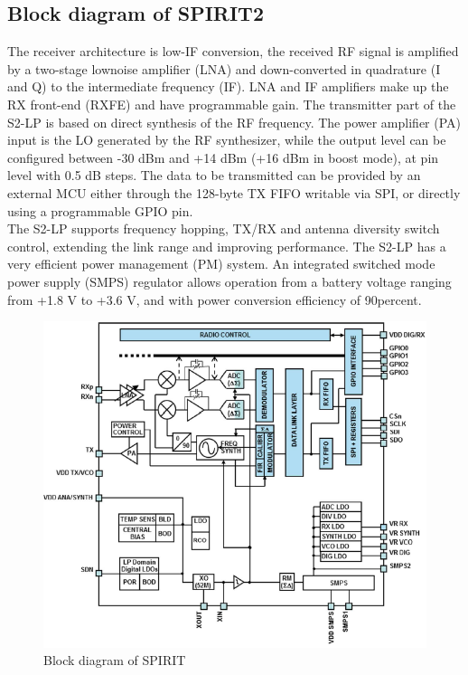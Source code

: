 \subsection{Block diagram of SPIRIT2}
The receiver architecture is low-IF conversion, the received RF signal is amplified by a two-stage lownoise amplifier (LNA) and down-converted in quadrature (I and Q) to the intermediate frequency (IF). LNA and IF amplifiers make up the RX front-end (RXFE) and have programmable gain. The transmitter part of the S2-LP is based on direct synthesis of the RF frequency. The power amplifier (PA) input is the LO generated by the RF synthesizer, while the output level can be configured between -30 dBm and +14 dBm (+16 dBm in boost mode), at pin level with 0.5 dB steps. The data to be transmitted can be provided by an external MCU either through the 128-byte TX FIFO writable via SPI, or directly using a programmable GPIO pin.\\
The S2-LP supports frequency hopping, TX/RX and antenna diversity switch control, extending the link range and improving performance. The S2-LP has a very efficient power management (PM) system. An integrated switched mode power supply (SMPS) regulator allows operation from a battery voltage ranging from +1.8 V to +3.6 V, and with power conversion efficiency of 90percent.
\begin{figure}[ht]
	\centering
	\includegraphics[scale=0.8]{images/spirit.png}
	\caption{Block diagram of SPIRIT}
\end{figure}
